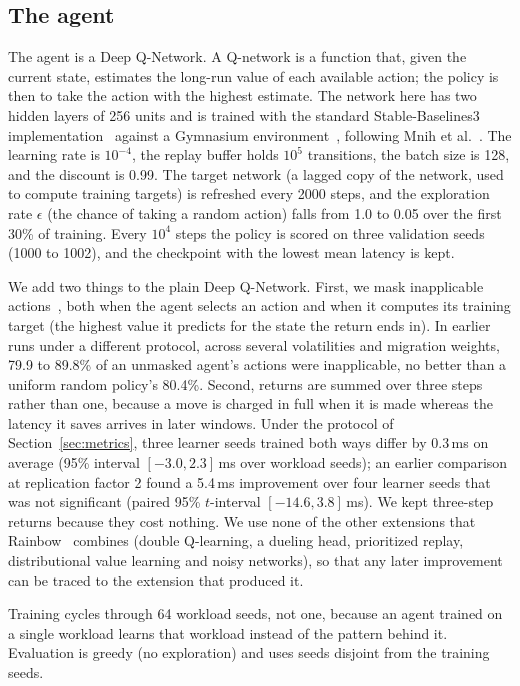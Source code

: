 \subsection{The agent}\label{sec:agent}

The agent is a Deep Q-Network. A Q-network is a function that, given the
current state, estimates the long-run value of each available action; the
policy is then to take the action with the highest estimate. The network here
has two hidden layers of 256 units and is trained with the standard
Stable-Baselines3 implementation~\cite{raffin2021sb3} against a Gymnasium
environment~\cite{towers2025gymnasium}, following Mnih et
al.~\cite{mnih2015dqn}. The learning rate is $10^{-4}$, the replay buffer holds
$10^5$ transitions, the batch size is 128, and the discount is 0.99. The target network
(a lagged copy of the network, used to compute training targets) is refreshed every 2000 steps,
and the exploration rate $\epsilon$ (the chance of taking a random action) falls from 1.0 to 0.05 over the
first 30\% of training. Every $10^4$ steps the policy is scored on three
validation seeds (1000 to 1002), and the checkpoint with the lowest mean latency is kept.

We add two things to the plain Deep Q-Network. First, we mask inapplicable
actions~\cite{huang2022masking,zahavy2018elimination}, both when the agent
selects an action and when it computes its training target (the highest value
it predicts for the state the return ends in). In earlier runs under a
different protocol, across several volatilities and migration weights, 79.9 to
89.8\% of an unmasked agent's actions were inapplicable, no better than a
uniform random policy's 80.4\%. Second, returns are summed over three steps
rather than one, because a move is charged in full when it is made whereas the
latency it saves arrives in later windows. Under the protocol of
Section~\ref{sec:metrics}, three learner seeds trained both ways differ by
0.3\,ms on average (95\% interval $[-3.0, 2.3]$\,ms over workload seeds); an
earlier comparison at replication factor 2 found a 5.4\,ms improvement over
four learner seeds that was not significant (paired 95\% $t$-interval
$[-14.6, 3.8]$\,ms). We kept three-step returns because they cost nothing. We
use none of the other extensions that Rainbow~\cite{hessel2018rainbow} combines
(double Q-learning, a dueling head, prioritized replay, distributional value
learning and noisy networks), so that any later
improvement can be traced to the extension that produced it.

Training cycles through 64 workload seeds, not one, because an agent trained on
a single workload learns that workload instead of the pattern behind it.
Evaluation is greedy (no exploration) and uses seeds disjoint from the training
seeds.

